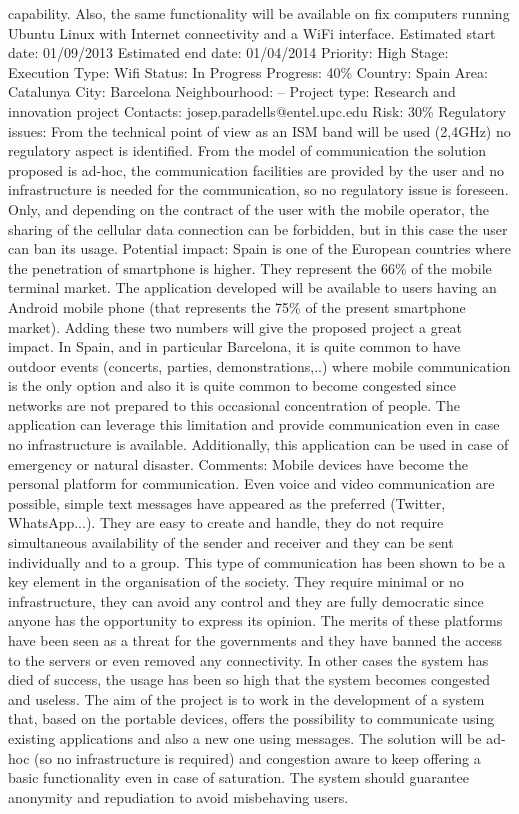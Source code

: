 \documentclass[draftclsnofoot,12pt,journal,onecolumn]{IEEEtran}
\begin{document}
capability. Also, the same functionality will be available on fix computers
running Ubuntu Linux with Internet connectivity and a WiFi interface.
Estimated start date: 01/09/2013
Estimated end date: 01/04/2014
Priority: High
Stage: Execution
Type: Wifi
Status: In Progress
Progress: 40\%
Country: Spain
Area: Catalunya
City: Barcelona
Neighbourhood: --
Project type: Research and innovation project
Contacts: josep.paradells@entel.upc.edu
Risk: 30\%
Regulatory issues:
 From the technical point of view as an ISM band will be used (2,4GHz) no
regulatory aspect is identified. From the model of communication the solution
proposed is ad-hoc, the communication facilities are provided by the user and
no infrastructure is needed for the communication, so no regulatory issue is
foreseen.
Only, and depending on the contract of the user with the mobile operator, the
sharing of the cellular data connection can be forbidden, but in this case
the user can ban its usage.
Potential impact:
Spain is one of the European countries where the penetration of smartphone is
higher. They represent the 66\% of the mobile terminal market. The application
developed will be available to users having an Android mobile phone (that
represents the 75\% of the present smartphone market). Adding these two
numbers will give the proposed project a great impact. In Spain, and in
particular Barcelona, it is quite common to have outdoor events (concerts,
parties, demonstrations,..) where mobile communication is the only option and
also it is quite common to become congested since networks are not prepared
to this occasional concentration of people.
The application can leverage this limitation and provide communication even
in case no infrastructure is available. Additionally, this application can be
used in case of emergency or natural disaster.
Comments:
Mobile devices have become the personal platform for communication. Even
voice and video communication are possible, simple text messages have
appeared as the preferred (Twitter, WhatsApp...). They are easy to create and
handle, they do not require simultaneous availability of the sender and
receiver and they can be sent individually and to a group.
This type of communication has been shown to be a key element in the
organisation of the society. They require minimal or no infrastructure, they
can avoid any control and they are fully democratic since anyone has the
opportunity to express its opinion.  The merits of these platforms have been
seen as a threat for the governments and they have banned the access to the
servers or even removed any connectivity. In other cases the system has died
of success, the usage has been so high that the system becomes congested and
useless.
The aim of the project is to work in the development of a system that, based
on the portable devices, offers the possibility to communicate using existing
applications and also a new one using messages. The solution will be ad-hoc
(so no infrastructure is required) and congestion aware to keep offering a
basic functionality even in case of saturation. The system should guarantee
anonymity and repudiation to avoid misbehaving users.
\end{document}
